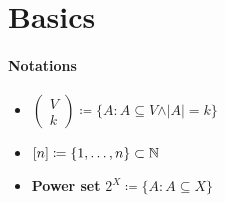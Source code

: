 \section{Basics}

\paragraph{Notations}
\begin{itemize}
  \item \( \left( \begin{smallmatrix}
    V \\ k
  \end{smallmatrix} \right) \coloneqq \{ A : A \subseteq V \wedge \vert A \vert = k \} \)
  \item \( [n] \coloneqq \{ 1, \dots, n \} \subset \mathbb{N} \)
  \item \textbf{Power set} \( 2^X \coloneqq \{ A : A \subseteq X \} \)
\end{itemize}

